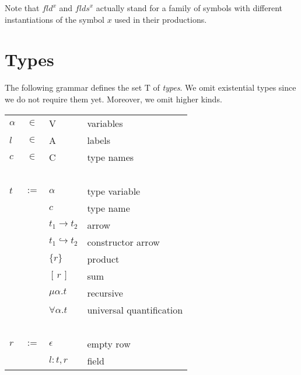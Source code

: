 \documentclass[twoside]{article}
\newcommand{\conarrow}{\hookrightarrow}
\newcommand{\x}[1]{\mathit{#1}}
\newcommand{\f}[1]{\mbox{#1}}
\newcommand{\fld}{\x{fld}}
\newcommand{\flds}{\x{flds}}
\begin{document}
Note that $\fld^x$ and $\flds^x$ actually stand for a family of symbols with different instantiations of the symbol $x$ used in their productions.


\section{Types}
\label{types}

The following grammar defines the set $\f{T}$ of {\em types}. We omit existential types since we do not require them yet. Moreover, we omit higher kinds.

\begin{center}
\begin{tabular}{lcll}
$\alpha$&$\in$&	\f{V}				& variables \\
$l$	&$\in$&	\f{A}				& labels \\
$c$	&$\in$&	\f{C}				& type names \\
\ \\

$t$	&$:=$&	$\alpha$			& type variable \\
	&&	$c$				& type name \\
	&&	$t_1 \to t_2$			& arrow \\
	&&	$t_1 \conarrow t_2$		& constructor arrow \\
	&&	$\{r\}$				& product \\
	&&	$[\,r\,]$			& sum \\
	&&	$\mu \alpha . t$		& recursive \\
	&&	$\forall \alpha . t$		& universal quantification \\
\ \\

$r$	&$:=$&	$\epsilon$			& empty row \\
	&&	$l:t,r$				& field \\
%
\end{tabular}
\end{center}
\end{document}
